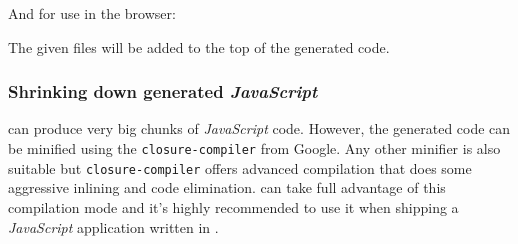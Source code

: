 \noindent
And for use in the browser:

\begin{code}
\end{code}

\noindent
The given files will be added to the top of the generated code.

\subsubsection*{Shrinking down generated \emph{JavaScript}}

\Idris{} can produce very big chunks of \emph{JavaScript} code.
However, the generated code can be minified using the \texttt{closure-compiler} from Google.
Any other minifier is also suitable but \texttt{closure-compiler} offers advanced compilation that does some aggressive inlining and code elimination.
\Idris{} can take full advantage of this compilation mode and it's highly recommended to use it when shipping a \emph{JavaScript} application written in \Idris{}.

